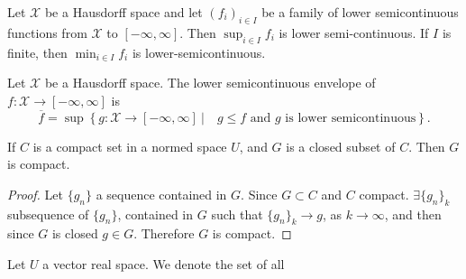 \begin{lemma}
	Let $\mathcal{X}$ be a Hausdorff space and let $(f_i)_{i \in I}$ be a family of lower semicontinuous functions from $\mathcal{X}$ to $[-\infty, \infty]$. Then $\sup_{i\in I}f_i$ is lower semi-continuous. If $I$ is finite, then $\min_{i\in I}f_i$ is lower-semicontinuous.
\end{lemma}
\begin{definition}
	Let $\mathcal{X}$ be a Hausdorff space. The lower semicontinuous envelope of $f: \mathcal{X}\rightarrow[-\infty, \infty]$ is 
	\[
	\overline{f}=\sup \left\lbrace g: \mathcal{X}\rightarrow[-\infty, \infty] \ |\quad  g\leq f \text{ and } g \text{ is lower semicontinuous}\right\rbrace.
	\]
\end{definition}
\begin{proposition}
	If $C$ is a compact set in a normed space $U$, and $G$ is a closed subset of $C$. Then $G$ is compact.
	\begin{proof}
		Let $\{ g_n\}$ a sequence contained in $G$. Since $G \subset C$ and $C$ compact. $\exists \{g_n\}_k$ subsequence of $\{g_n\}$, contained in $G$ such that $\{g_n\}_k \rightarrow g$, as $k \rightarrow \infty$, and then since $G$ is closed $g \in G$. Therefore $G$ is compact.
	\end{proof}
	\label{prop0. closed subset compact. Precompact}
\end{proposition}

\begin{definition}
	Let $U$ a vector real space. We denote the set of all 
\end{definition}


